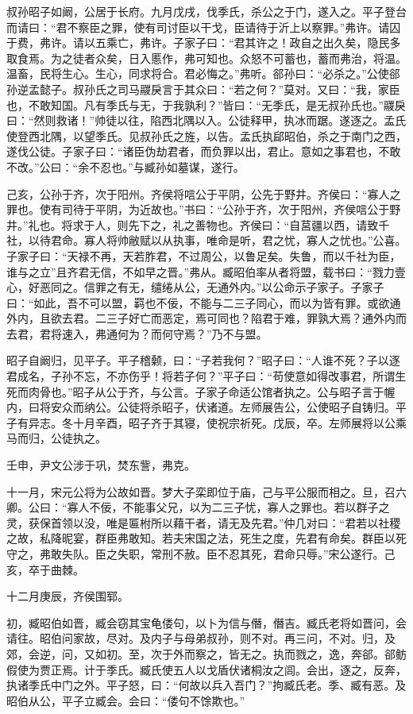\documentclass[]{article}
\begin{document}
叔孙昭子如阚，公居于长府。九月戊戌，伐季氏，杀公之于门，遂入之。平子登台而请曰：``君不察臣之罪，使有司讨臣以干戈，臣请待于沂上以察罪。''弗许。请囚于费，弗许。请以五乘亡，弗许。子家子曰：``君其许之！政自之出久矣，隐民多取食焉。为之徒者众矣，日入慝作，弗可知也。众怒不可蓄也，蓄而弗治，将温。温畜，民将生心。生心，同求将合。君必悔之。''弗听。郤孙曰：``必杀之。''公使郤孙逆孟懿子。叔孙氏之司马鬷戾言于其众曰：``若之何？''莫对。又曰：``我，家臣也，不敢知国。凡有季氏与无，于我孰利？''皆曰：``无季氏，是无叔孙氏也。''鬷戾曰：``然则救诸！''帅徒以往，陷西北隅以入。公徒释甲，执冰而踞。遂逐之。孟氏使登西北隅，以望季氏。见叔孙氏之旌，以告。孟氏执郈昭伯，杀之于南门之西，遂伐公徒。子家子曰：``诸臣伪劫君者，而负罪以出，君止。意如之事君也，不敢不改。''公曰：``余不忍也。''与臧孙如墓谋，遂行。

己亥，公孙于齐，次于阳州。齐侯将唁公于平阴，公先于野井。齐侯曰：``寡人之罪也。使有司待于平阴，为近故也。''书曰：``公孙于齐，次于阳州，齐侯唁公于野井。''礼也。将求于人，则先下之，礼之善物也。齐侯曰：``自莒疆以西，请致千社，以待君命。寡人将帅敝赋以从执事，唯命是听，君之忧，寡人之忧也。''公喜。子家子曰：``天禄不再，天若胙君，不过周公，以鲁足矣。失鲁，而以千社为臣，谁与之立''且齐君无信，不如早之晋。''弗从。臧昭伯率从者将盟，载书曰：``戮力壹心，好恶同之。信罪之有无，缱绻从公，无通外内。''以公命示子家子。子家子曰：``如此，吾不可以盟，羁也不佞，不能与二三子同心，而以为皆有罪。或欲通外内，且欲去君。二三子好亡而恶定，焉可同也？陷君于难，罪孰大焉？通外内而去君，君将速入，弗通何为？而何守焉？''乃不与盟。

昭子自阚归，见平子。平子稽颡，曰：``子若我何？''昭子曰：``人谁不死？子以逐君成名，子孙不忘，不亦伤乎！将若子何？''平子曰：``苟使意如得改事君，所谓生死而肉骨也。''昭子从公于齐，与公言。子家子命适公馆者执之。公与昭子言于幄内，曰将安众而纳公。公徒将杀昭子，伏诸道。左师展告公，公使昭子自铸归。平子有异志。冬十月辛酉，昭子齐于其寝，使祝宗祈死。戊辰，卒。左师展将以公乘马而归，公徒执之。

壬申，尹文公涉于巩，焚东訾，弗克。

十一月，宋元公将为公故如晋。梦大子栾即位于庙，己与平公服而相之。旦，召六卿。公曰：``寡人不佞，不能事父兄，以为二三子忧，寡人之罪也。若以群子之灵，获保首领以没，唯是匾柎所以藉干者，请无及先君。''仲几对曰：``君若以社稷之故，私降昵宴，群臣弗敢知。若夫宋国之法，死生之度，先君有命矣。群臣以死守之，弗敢失队。臣之失职，常刑不赦。臣不忍其死，君命只辱。''宋公遂行。己亥，卒于曲棘。

十二月庚辰，齐侯围郓。

初，臧昭伯如晋，臧会窃其宝龟偻句，以卜为信与僭，僭吉。臧氏老将如晋问，会请往。昭伯问家故，尽对。及内子与母弟叔孙，则不对。再三问，不对。归，及郊，会逆，问，又如初。至，次于外而察之，皆无之。执而戮之，逸，奔郤。郤鲂假使为贾正焉。计于季氏。臧氏使五人以戈盾伏诸桐汝之闾。会出，逐之，反奔，执诸季氏中门之外。平子怒，曰：``何故以兵入吾门？''拘臧氏老。季、臧有恶。及昭伯从公，平子立臧会。会曰：``偻句不馀欺也。''
\end{document}
